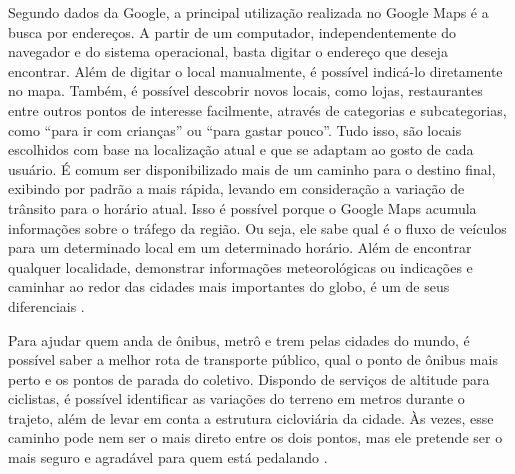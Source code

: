 Segundo dados da Google, a principal utilização realizada no Google Maps é a busca por endereços. A partir de um computador, independentemente do navegador e do sistema operacional, basta digitar o endereço que deseja encontrar. Além de digitar o local manualmente, é possível indicá-lo diretamente no mapa. Também, é possível descobrir novos locais, como lojas, restaurantes entre outros pontos de interesse facilmente, através de categorias e subcategorias, como “para ir com crianças” ou “para gastar pouco”. Tudo isso, são locais escolhidos com base na localização atual e que se adaptam ao gosto de cada usuário. É comum ser disponibilizado mais de um caminho para o destino final, exibindo por padrão a mais rápida, levando em consideração a variação de trânsito para o horário atual. Isso é possível porque o Google Maps acumula informações sobre o tráfego da região. Ou seja, ele sabe qual é o fluxo de veículos para um determinado local em um determinado horário. Além de encontrar qualquer localidade, demonstrar informações meteorológicas ou indicações e caminhar ao redor das cidades mais importantes do globo, é um de seus diferenciais \cite{google:2019}.


Para ajudar quem anda de ônibus, metrô e trem pelas cidades do mundo, é possível saber a melhor rota de transporte público, qual o ponto de ônibus mais perto e os pontos de parada do coletivo. Dispondo de serviços de altitude para ciclistas, é possível identificar as variações do terreno em metros durante o trajeto, além de levar em conta a estrutura cicloviária da cidade. Às vezes, esse caminho pode nem ser o mais direto entre os dois pontos, mas ele pretende ser o mais seguro e agradável para quem está pedalando \cite{google:2019}.

